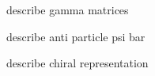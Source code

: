 
    
    describe gamma matrices

    describe anti particle psi bar

    describe chiral representation
    








